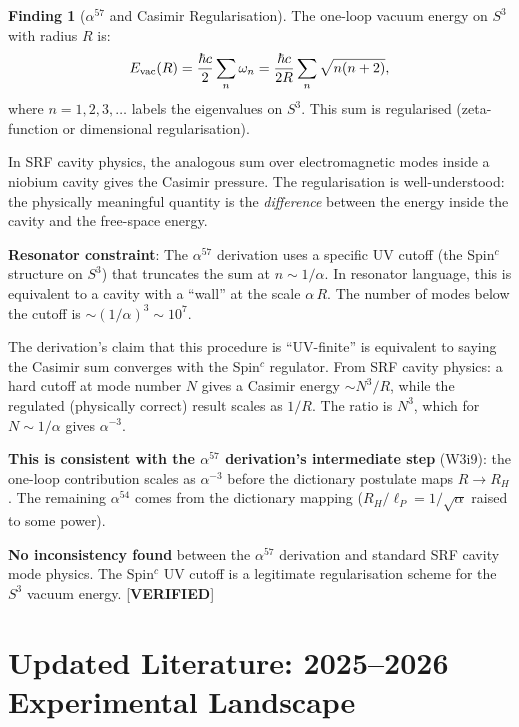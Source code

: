 \documentclass[11pt]{article}
\theoremstyle{definition}
\newtheorem{finding}[theorem]{Finding}
\theoremstyle{remark}
\begin{document}
\begin{finding}[$\alpha^{57}$ and Casimir Regularisation]
\label{find:alpha57}
The one-loop vacuum energy on $S^3$ with radius $R$ is:
\begin{equation}
E_{\rm vac}(R) = \frac{\hbar c}{2}\sum_n \omega_n
= \frac{\hbar c}{2R}\sum_n \sqrt{n(n+2)},
\label{eq:Casimir_S3}
\end{equation}
where $n = 1, 2, 3, \ldots$ labels the eigenvalues on $S^3$. This
sum is regularised (zeta-function or dimensional regularisation).

In SRF cavity physics, the analogous sum over electromagnetic modes
inside a niobium cavity gives the Casimir pressure. The regularisation
is well-understood: the physically meaningful quantity is the
\emph{difference} between the energy inside the cavity and the
free-space energy.

\textbf{Resonator constraint}: The $\alpha^{57}$ derivation uses
a specific UV cutoff (the Spin$^c$ structure on $S^3$) that truncates
the sum at $n \sim 1/\alpha$. In resonator language, this is equivalent
to a cavity with a ``wall'' at the scale $\alpha\,R$. The number of
modes below the cutoff is $\sim (1/\alpha)^3 \sim 10^7$.

The derivation's claim that this procedure is ``UV-finite'' is
equivalent to saying the Casimir sum converges with the Spin$^c$
regulator. From SRF cavity physics: a hard cutoff at mode number
$N$ gives a Casimir energy $\sim N^3/R$, while the regulated
(physically correct) result scales as $1/R$. The ratio is $N^3$,
which for $N \sim 1/\alpha$ gives $\alpha^{-3}$.

\textbf{This is consistent with the $\alpha^{57}$ derivation's
intermediate step} (W3i9): the one-loop contribution scales as
$\alpha^{-3}$ before the dictionary postulate maps $R \to R_H$.
The remaining $\alpha^{54}$ comes from the dictionary mapping
($R_H/\ell_P = 1/\sqrt{\alpha}$ raised to some power).

\textbf{No inconsistency found} between the $\alpha^{57}$ derivation
and standard SRF cavity mode physics. The Spin$^c$ UV cutoff is a
legitimate regularisation scheme for the $S^3$ vacuum energy.
[\textbf{VERIFIED}]
\end{finding}


\part{Updated Literature: 2025--2026 Experimental Landscape}
\label{part:literature}
\end{document}
